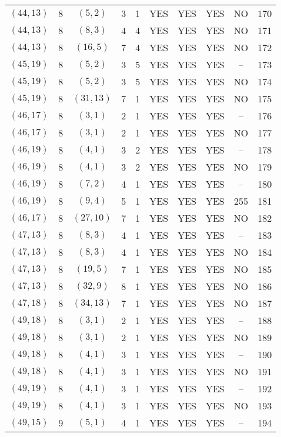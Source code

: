 \begin{longtable}{|c|c|c|c|c|c|c|c|c|c|}
$(44, 13)$ & 8 & $(5, 2)$ & 3 & 1 & YES & YES & YES & NO & 170\\
$(44, 13)$ & 8 & $(8, 3)$ & 4 & 4 & YES & YES & YES & NO & 171\\
$(44, 13)$ & 8 & $(16, 5)$ & 7 & 4 & YES & YES & YES & NO & 172\\
$(45, 19)$ & 8 & $(5, 2)$ & 3 & 5 & YES & YES & YES & -- & 173\\
$(45, 19)$ & 8 & $(5, 2)$ & 3 & 5 & YES & YES & YES & NO & 174\\
$(45, 19)$ & 8 & $(31, 13)$ & 7 & 1 & YES & YES & YES & NO & 175\\
$(46, 17)$ & 8 & $(3, 1)$ & 2 & 1 & YES & YES & YES & -- & 176\\
$(46, 17)$ & 8 & $(3, 1)$ & 2 & 1 & YES & YES & YES & NO & 177\\
$(46, 19)$ & 8 & $(4, 1)$ & 3 & 2 & YES & YES & YES & -- & 178\\
$(46, 19)$ & 8 & $(4, 1)$ & 3 & 2 & YES & YES & YES & NO & 179\\
$(46, 19)$ & 8 & $(7, 2)$ & 4 & 1 & YES & YES & YES & -- & 180\\
$(46, 19)$ & 8 & $(9, 4)$ & 5 & 1 & YES & YES & YES & 255 & 181\\
$(46, 17)$ & 8 & $(27, 10)$ & 7 & 1 & YES & YES & YES & NO & 182\\
$(47, 13)$ & 8 & $(8, 3)$ & 4 & 1 & YES & YES & YES & -- & 183\\
$(47, 13)$ & 8 & $(8, 3)$ & 4 & 1 & YES & YES & YES & NO & 184\\
$(47, 13)$ & 8 & $(19, 5)$ & 7 & 1 & YES & YES & YES & NO & 185\\
$(47, 13)$ & 8 & $(32, 9)$ & 8 & 1 & YES & YES & YES & NO & 186\\
$(47, 18)$ & 8 & $(34, 13)$ & 7 & 1 & YES & YES & YES & NO & 187\\
$(49, 18)$ & 8 & $(3, 1)$ & 2 & 1 & YES & YES & YES & -- & 188\\
$(49, 18)$ & 8 & $(3, 1)$ & 2 & 1 & YES & YES & YES & NO & 189\\
$(49, 18)$ & 8 & $(4, 1)$ & 3 & 1 & YES & YES & YES & -- & 190\\
$(49, 18)$ & 8 & $(4, 1)$ & 3 & 1 & YES & YES & YES & NO & 191\\
$(49, 19)$ & 8 & $(4, 1)$ & 3 & 1 & YES & YES & YES & -- & 192\\
$(49, 19)$ & 8 & $(4, 1)$ & 3 & 1 & YES & YES & YES & NO & 193\\
$(49, 15)$ & 9 & $(5, 1)$ & 4 & 1 & YES & YES & YES & -- & 194\\

\end{longtable}
